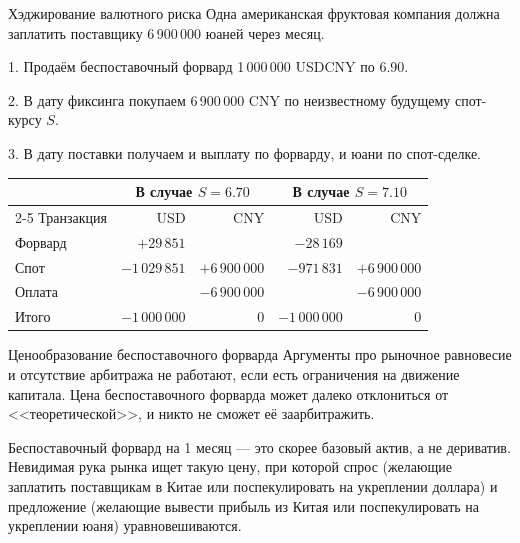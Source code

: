 \documentclass{beamer}
\begin{document}
\begin{frame}{Хэджирование валютного риска}
\justify
Одна американская фруктовая компания должна заплатить поставщику 6\,900\,000 юаней через месяц.

1. Продаём беспоставочный форвард 1\,000\,000 USDCNY по 6.90.

2. В дату фиксинга покупаем 6\,900\,000 CNY по неизвестному будущему спот-курсу $S$.

3. В дату поставки получаем и выплату по форварду, и юани по спот-сделке.

\justify
\centering
\small
\begin{tabular}{l|r|r|r|r}
& \multicolumn{2}{c|}{В случае $S=6.70$} & \multicolumn{2}{c}{В случае $S=7.10$} \\ \cline{2-5}
Транзакция & USD & CNY & USD & CNY \\ \hline
Форвард & $+29\,851$ &  &  $-28\,169$& \\
Спот & $-1\,029\,851$ & $+6\,900\,000$ & $-971\,831$ & $+6\,900\,000$ \\
Оплата & & $-6\,900\,000$ & & $-6\,900\,000$ \\ \hline
Итого & $-1\,000\,000$ & 0 & $-1\,000\,000$ & 0
\end{tabular}\end{frame}



\begin{frame}{Ценообразование беспоставочного форварда}
\justify
Аргументы про рыночное равновесие и отсутствие арбитража не работают, если есть ограничения на движение капитала. Цена беспоставочного форварда может далеко отклониться от <<теоретической>>, и никто не сможет её заарбитражить.

\justify
Беспоставочный форвард на 1 месяц --- это скорее базовый актив, а не дериватив. Невидимая рука рынка ищет такую цену, при которой спрос (желающие заплатить поставщикам в Китае или поспекулировать на укреплении доллара) и предложение (желающие вывести прибыль из Китая или поспекулировать на укреплении юаня) уравновешиваются.
\end{frame}
\end{document}
